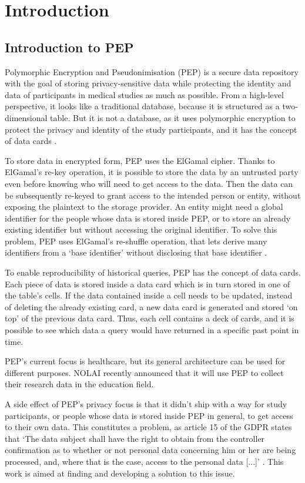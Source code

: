 \documentclass{report}
\begin{document}
\tableofcontents
\pagebreak

\chapter{Introduction}
\section{Introduction to PEP}
Polymorphic Encryption and Pseudonimisation (PEP) is a secure data repository with the goal of storing privacy-sensitive data while protecting the identity and data of participants
in medical studies as much as possible. From a high-level perspective, it looks like a traditional database, because it is structured as a two-dimensional table. But it is not a 
database, as it uses polymorphic encryption to protect the privacy and identity of the study participants, and it has the concept of data cards \cite{pep-blueprint}.\par
To store data in encrypted form, PEP uses the ElGamal cipher. Thanks to ElGamal's re-key operation, it is possible to store the data by an untrusted party even before knowing who
will need to get access to the data. Then the data can be subsequently re-keyed to grant access to the intended person or entity, without exposing the plaintext to the storage provider.
An entity might need a global identifier for the people whose data is stored inside PEP, or to store an already existing identifier but without accessing the original identifier. To
solve this problem, PEP uses ElGamal's re-shuffle operation, that lets derive many identifiers from a \enquote*{base identifier} without disclosing that base identifier \cite{peppaper}.\par
To enable reproducibility of historical queries, PEP has the concept of data cards. Each piece of data is stored inside a data card which is in turn stored in one of the table's
cells. If the data contained inside a cell needs to be updated, instead of deleting the already existing card, a new data card is generated and stored \enquote*{on top} of the previous data
card. Thus, each cell contains a deck of cards, and it is possible to see which data a query would have returned in a specific past point in time. \par
PEP's current focus is healthcare, but its general architecture can be used for different purposes. NOLAI \cite{nolai} \cite{pepproject} recently announced that it will use PEP to
collect their research data in the education field. \par
A side effect of PEP's privacy focus is that it didn't ship with a way for study participants, or people whose data is stored inside PEP in general, to get access to their own
data. This constitutes a problem, as article 15 of the GDPR states that \enquote*{The data subject shall have the right to obtain from the controller confirmation as to whether or not
personal data concerning him or her are being processed, and, where that is the case, access to the personal data [...]} \cite{gdpr-art-15}. 
This work is aimed at finding and developing a solution to this issue.
\end{document}

